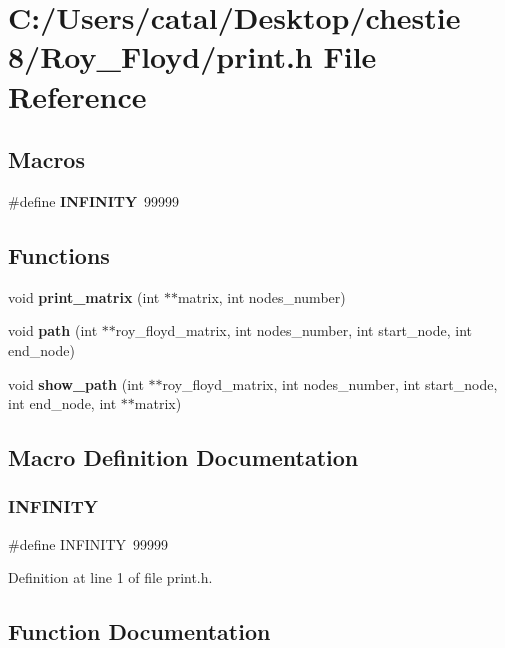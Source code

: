 \section{C\+:/\+Users/catal/\+Desktop/chestie 8/\+Roy\+\_\+\+Floyd/print.h File Reference}
\label{print_8h}
\subsection*{Macros}
\begin{DoxyCompactItemize}
\item 
\#define \textbf{ I\+N\+F\+I\+N\+I\+TY}~99999
\end{DoxyCompactItemize}
\subsection*{Functions}
\begin{DoxyCompactItemize}
\item 
void \textbf{ print\+\_\+matrix} (int $\ast$$\ast$matrix, int nodes\+\_\+number)
\item 
void \textbf{ path} (int $\ast$$\ast$roy\+\_\+floyd\+\_\+matrix, int nodes\+\_\+number, int start\+\_\+node, int end\+\_\+node)
\item 
void \textbf{ show\+\_\+path} (int $\ast$$\ast$roy\+\_\+floyd\+\_\+matrix, int nodes\+\_\+number, int start\+\_\+node, int end\+\_\+node, int $\ast$$\ast$matrix)
\end{DoxyCompactItemize}


\subsection{Macro Definition Documentation}
\mbox{\label{print_8h_a956e2723d559858d08644ac99146e910}} 
\subsubsection{I\+N\+F\+I\+N\+I\+TY}
{\footnotesize\ttfamily \#define I\+N\+F\+I\+N\+I\+TY~99999}



Definition at line 1 of file print.\+h.



\subsection{Function Documentation}
\mbox{\label{print_8h_a81a46cab620746bb88e7c79de23e9d76}} 
